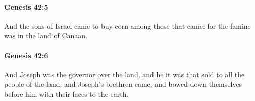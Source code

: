 		\paragraph{Genesis 42:5} %
			\label{GENESIS-42-5}

			And the sons of Israel came to buy corn among those that came: for the famine was in the land of Canaan.


		\paragraph{Genesis 42:6} %
			\label{GENESIS-42-6}

			And Joseph was the governor over the land, and he it was that sold to all the people of the land: and Joseph's brethren came, and bowed down themselves before him with their faces to the earth.


